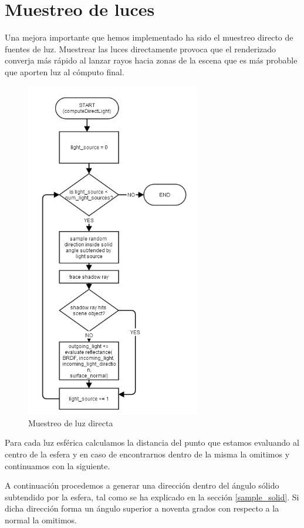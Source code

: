 \clearpage

\section{Muestreo de luces}

Una mejora importante que hemos implementado ha sido el muestreo directo de fuentes de luz. Muestrear las luces directamente provoca que el renderizado converja más rápido al lanzar rayos hacia zonas de la escena que es más probable que aporten luz al cómputo final.

\begin{figure}[h]
\centering
\includegraphics[width=3in]{light_sampling.png}
\caption{Muestreo de luz directa}
\end{figure}

\clearpage

Para cada luz esférica calculamos la distancia del punto que estamos evaluando al centro de la esfera y en caso de encontrarnos dentro de la misma la omitimos y continuamos con la siguiente.

\medskip


A continuación procedemos a generar una dirección dentro del ángulo sólido subtendido por la esfera, tal como se ha explicado en la sección \ref{sample_solid}. Si dicha dirección forma un ángulo superior a noventa grados con respecto a la normal la omitimos.


